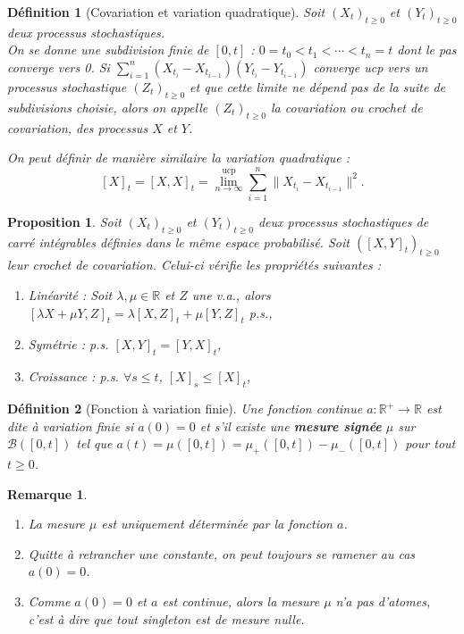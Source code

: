\documentclass[openany]{book}
\newcommand{\R}{\mathbb{R}}
\newcommand{\1}{\mathbbm{1}}
\theoremstyle{thmfont}
\theoremstyle{deffont}
\newtheorem{definition}[definition]{Définition}
\theoremstyle{thmfont}
\newtheorem{prop}[prop]{Proposition}
\theoremstyle{deffont}
\newtheorem{remark}[remark]{Remarque}
\begin{document}
\begin{definition}[Covariation et variation quadratique] Soit $(X_t)_{t\geq0}$ et $(Y_t)_{t\geq0}$ deux processus stochastiques. \\
  On se donne une subdivision finie de $[0,t]$ :  $0 = t_0 < t_1 < \cdots < t_n = t$ dont le pas converge vers 0. Si $\sum_{i = 1}^n(X_{t_i} - X_{t_{i-1}})(Y_{t_i} - Y_{t_{i-1}})$ converge ucp vers un processus stochastique $(Z_t)_{t\geq0}$ et que cette limite ne dépend pas de la suite de subdivisions choisie, alors on appelle $(Z_t)_{t\geq0}$ la \textit{covariation} ou \textit{crochet de covariation}, des processus $X$ et $Y$.

 \noindent On peut définir de manière similaire la \textit{variation quadratique} :
 $$[X]_t = [X,X]_t = \lim_{n\to \infty}^{\text{ucp}} \sum_{i = 1}^n\|X_{t_i} - X_{t_{i-1}}\|^2.$$
\label{def:crochet}
\end{definition}


\begin{prop} Soit $(X_t)_{t\geq0}$ et $(Y_t)_{t\geq0}$ deux processus stochastiques de carré intégrables définies dans le même espace probabilisé. Soit $([X,Y]_t)_{t\geq0}$ leur crochet de covariation. Celui-ci vérifie les propriétés suivantes : 
  \begin{enumerate}
  \item Linéarité : Soit $\lambda, \mu \in \R$ et $Z$ une v.a., alors $[\lambda X + \mu Y, Z]_t = \lambda[X,Z]_t + \mu[Y,Z]_t$ p.s.,
  \item Symétrie : p.s. $[X,Y]_t = [Y,X]_t$,
  \item Croissance : p.s. $\forall s\leq t$, $[X]_s \leq [X]_t$,
  \end{enumerate}
\end{prop}

\begin{definition}[Fonction à variation finie] Une fonction continue $a : \R^+ \rightarrow \R$ est dite \textit{à variation finie} si $a(0) = 0$ et s'il existe une \textbf{mesure
    signée} $\mu$ sur $\mathcal B([0,t])$ tel que $a(t) = \mu([0,t]) = \mu_+([0,t]) - \mu_-([0,t])$ pour tout $t \geq 0$.
\label{def:fct_var_finie}
\end{definition}

\begin{remark}
  \begin{enumerate}
  \item La mesure $\mu$ est uniquement déterminée par la fonction $a$.
  \item Quitte à retrancher une constante, on peut toujours se ramener au cas $a(0) = 0$.
  \item Comme $a(0) = 0$ et $a$ est continue, alors la mesure $\mu$ n'a pas d'\textit{atomes}, c'est à dire que tout singleton est de mesure nulle.
  \end{enumerate}
\end{remark}
\end{document}
